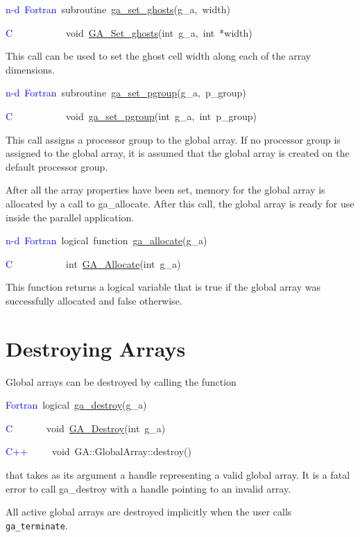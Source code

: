\begin{lyxcode}
\textcolor{blue}{n-d~Fortran}~subroutine~\href{http://www.emsl.pnl.gov/docs/global/ga_ops.html\#NGA_SET_GHOSTS}{ga\_{}set\_{}ghosts}(g\_a,~width)~

\textcolor{blue}{C}~~~~~~~~~~~void~\href{http://www.emsl.pnl.gov/docs/global/c_nga_ops.html\#GA_SET_GHOSTS}{GA\_{}Set\_{}ghosts}(int~g\_a,~int~{*}width)
\end{lyxcode}
This call can be used to set the ghost cell width along each of the
array dimensions.
\begin{lyxcode}
\textcolor{blue}{n-d~Fortran}~subroutine~\href{http://www.emsl.pnl.gov/docs/global/ga_ops.html\#GA_SET_PGROUP}{ga\_{}set\_{}pgroup}(g\_a,~p\_group)~

\textcolor{blue}{C}~~~~~~~~~~~void~\href{http://www.emsl.pnl.gov/docs/global/c_nga_ops.html\#GA_SET_PGROUP}{ga\_{}set\_{}pgroup}(int~g\_a,~int~p\_group)
\end{lyxcode}
This call assigns a processor group to the global array. If no processor
group is assigned to the global array, it is assumed that the global
array is created on the default processor group.

After all the array properties have been set, memory for the global
array is allocated by a call to ga\_allocate. After this call, the
global array is ready for use inside the parallel application.
\begin{lyxcode}
\textcolor{blue}{n-d~Fortran}~logical~function~\href{http://www.emsl.pnl.gov/docs/global/ga_ops.html\#GA_ALLOCATE}{ga\_{}allocate}(g\_a)~

\textcolor{blue}{C}~~~~~~~~~~~int~\href{http://www.emsl.pnl.gov/docs/global/c_nga_ops.html\#GA_ALLOCATE}{GA\_{}Allocate}(int~g\_a)
\end{lyxcode}
This function returns a logical variable that is true if the global
array was successfully allocated and false otherwise. 


\section{Destroying Arrays }

Global arrays can be destroyed by calling the function
\begin{lyxcode}
\textcolor{blue}{Fortran}~logical~\href{http://www.emsl.pnl.gov/docs/global/ga_ops.html\#ga_destroy}{ga\_{}destroy}(g\_a)~

\textcolor{blue}{C}~~~~~~~void~\href{http://www.emsl.pnl.gov/docs/global/c_nga_ops.html\#ga_destroy}{GA\_{}Destroy}(int~g\_a)~

\textcolor{blue}{C++}~~~~~void~GA::GlobalArray::destroy()
\end{lyxcode}
that takes as its argument a handle representing a valid global array.
It is a fatal error to call ga\_destroy with a handle pointing to
an invalid array.

All active global arrays are destroyed implicitly when the user calls
\texttt{ga\_terminate}.
